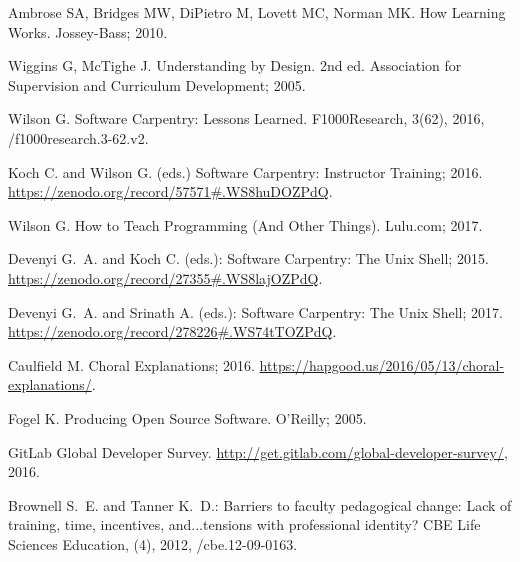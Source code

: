 \documentclass[10pt,letterpaper]{article}
\begin{document}
\begin{thebibliography}{1}

Ambrose SA, Bridges MW, DiPietro M, Lovett MC, Norman MK.
\newblock How Learning Works.
\newblock Jossey-Bass; 2010.

Wiggins G, McTighe J.
\newblock Understanding by Design.
\newblock 2nd ed. Association for Supervision and Curriculum Development; 2005.

Wilson G.
\newblock Software Carpentry: Lessons Learned.
\newblock F1000Research, 3(62), 2016,
/f1000research.3-62.v2.

Koch C. and Wilson G. (eds.)
\newblock Software Carpentry: Instructor Training; 2016.
\newblock \url{https://zenodo.org/record/57571#.WS8huDOZPdQ}.

Wilson G.
\newblock How to Teach Programming (And Other Things).
\newblock Lulu.com; 2017.

Devenyi G.~A. and Koch C. (eds.):
Software Carpentry: The Unix Shell; 2015.
\newblock \url{https://zenodo.org/record/27355#.WS8lajOZPdQ}.

Devenyi G.~A. and Srinath A. (eds.):
Software Carpentry: The Unix Shell; 2017.
\newblock \url{https://zenodo.org/record/278226#.WS74tTOZPdQ}.

Caulfield M. Choral Explanations; 2016.
\newblock \url{https://hapgood.us/2016/05/13/choral-explanations/}.

Fogel K.
\newblock Producing Open Source Software.
\newblock O'Reilly; 2005.

GitLab
\newblock Global Developer Survey.
\newblock \url{http://get.gitlab.com/global-developer-survey/}, 2016.

Brownell S.~E. and Tanner K.~D.:
Barriers to faculty pedagogical change: Lack of training, time, incentives, and...tensions with professional identity?
\newblock CBE Life Sciences Education,
(4), 2012,
/cbe.12-09-0163.

\end{thebibliography}
\end{document}
